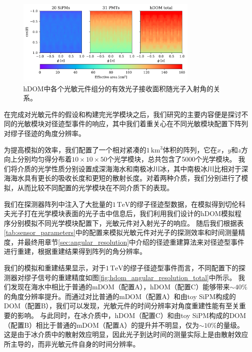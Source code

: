 \begin{figure}[!htb]%
    \centering
    \includegraphics[width=0.80\textwidth]{img/hdom_effective_area.pdf}
    \caption{hDOM中各个光敏元件组分的有效光子接收面积随光子入射角的关系。}
    \label{fig:hdom_effective_area}
\end{figure}

在完成对光敏元件的假设和构建完光学模块之后，我们研究的主要内容便是探讨不同的光敏模块对径迹型事件的响应，其中我们着重关心在不同光敏模块配置下阵列对缪子径迹的角度分辨率。

为提高模拟的效率，我们配置了一个相对紧凑的$1\,\mathrm{km^3}$体积的阵列，它在$x$，$y$和$z$方向上分别均匀得分布着$10 \times 10 \times 50$个光学模块，总共包含了5000个光学模块。
我们将介质的光学性质分别设置成深海海水和南极冰川冰，其中南极冰川比相对于深海海水具有更长的吸收长度和更短的散射长度\cite{OP_IceCube:2013, OP_KM3NeT_LAMS:2011}。对着两种介质，我们分别进行了模拟，从而比较不同配置的光学模块在不同介质下的表现。

我们在探测器阵列中注入了大批量的$1\,\mathrm{TeV}$的缪子径迹型数据，在模拟得到切伦科夫光子打在光学模块表面的光子击中信息后，我们利用我们设计的hDOM模拟程序分别模拟不同光学模块配置下，光敏元件对入射光子的响应。
随后我们根据表\ref{tab:sensor_parameters}中的配置来模拟光敏元件对光子的探测效率和时间测量精度，并最终用章节\ref{sec:angular_resolution}中介绍的径迹重建算法来对径迹型事件进行重建，根据重建结果得到阵列的角分辨率。

我们的模拟和重建结果显示，对于$1\,\mathrm{TeV}$的缪子径迹型事件而言，不同配置下的探测器对缪子信号的重建精度如图\ref{fig:hdom_angular_resolution_total}中所示。
我们发现在海水中相比于普通的mDOM（配置A），hDOM（配置C）能够带来$\sim40\%$的角度分辨率提升。而通过对比普通的mDOM（配置A）和由toy SiPM构成的DOM（配置B），我们可以发现，光敏元件的时间分辨率对角度重建性能有至关重要的影响。
与此同时，在冰介质中，hDOM（配置C）和由toy SiPM构成的DOM（配置B）相比于普通的mDOM（配置A）的提升并不明显，仅为$\sim 10\%$的量级。这是由于冰介质中的散射效应明显，因此光子到达时间的测量实际上是由散射效应所主导的，而非光敏元件自身的时间分辨率。

